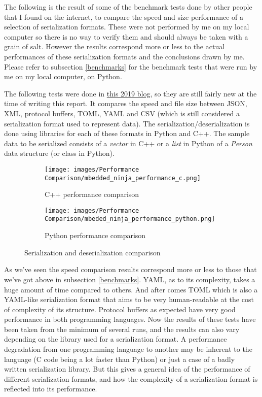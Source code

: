 \documentclass[12pt]{article}
\begin{document}
The following is the result of some of the benchmark tests done by other people that I found on the internet, to compare the speed and size performance of a selection of serialization formats. These were not performed by me on my local computer so there is no way to verify them and should always be taken with a grain of salt. However the results correspond more or less to the actual performances of these serialization formats and the conclusions drawn by me. Please refer to subsection \ref{benchmarks} for the benchmark tests that were run by me on my local computer, on Python.

The following tests were done in \href{https://blog.mbedded.ninja/programming/serialization-formats/a-comparison-of-serialization-formats/#speed-comparison-benchmarking}{this 2019 blog}, so they are still fairly new at the time of writing this report. It compares the speed and file size between JSON, XML, protocol buffers, TOML, YAML and CSV (which is still considered a serialization format used to represent data). The serialization/deserialization is done using libraries for each of these formats in Python and C++. The sample data to be serialized consists of a \emph{vector} in C++ or a \emph{list} in Python of a \emph{Person} data structure (or class in Python).

\begin{figure}[h]

\begin{subfigure}{0.4\textwidth}
\texttt{[image: images/Performance Comparison/mbedded\_ninja\_performance\_c.png]} 
\caption{C++ performance comparison}
\label{fig:subim1}
\end{subfigure}
\hfill
\begin{subfigure}{0.4\textwidth}
\texttt{[image: images/Performance Comparison/mbeded\_ninja\_performance\_python.png]}
\caption{Python performance comparison}
\label{fig:subim2}
\end{subfigure}
\caption{Serialization and deserialization comparison}
\label{fig:image2}
\end{figure}

As we’ve seen the speed comparison results correspond more or less to those that we’ve got above in subsection \ref{benchmarks}. YAML, as to its complexity, takes a huge amount of time compared to others.  And after comes TOML which is also a YAML-like serialization format that aims to be very human-readable at the cost of complexity of its structure. Protocol buffers as expected have very good performance in both programming languages. Now the results of these tests have been taken from the minimum of several runs, and the results can also vary depending on the library used for a serialization format. A performance degradation from one programming language to another may be inherent to the language (C code being a lot faster than Python) or just a case of a badly written serialization library. 
But this gives a general idea of the performance of different serialization formats, and how the complexity of a serialization format is reflected into its performance.
\end{document}
